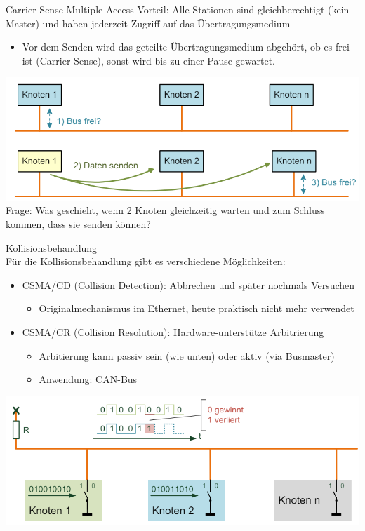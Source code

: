 \begin{definition}{Carrier Sense Multiple Access}
    Vorteil: Alle Stationen sind gleichberechtigt (kein Master) und haben jederzeit Zugriff auf das Übertragungsmedium
    \begin{itemize}
        \item Vor dem Senden wird das geteilte Übertragungsmedium abgehört, ob es frei ist (Carrier Sense), sonst wird bis zu einer Pause gewartet.
    \end{itemize}
        \includegraphics[width=0.75\linewidth]{images/random_access_thingy.png}\\
    Frage: Was geschieht, wenn 2 Knoten gleichzeitig warten und zum Schluss kommen, dass sie senden können?
\end{definition}

\begin{concept}{Kollisionsbehandlung}\\
    Für die Kollisionsbehandlung gibt es verschiedene Möglichkeiten:
    \begin{itemize}
        \item CSMA/CD (Collision Detection): Abbrechen und später nochmals Versuchen
        \begin{itemize}
            \item Originalmechanismus im Ethernet, heute praktisch nicht mehr verwendet
        \end{itemize}
        \item CSMA/CR (Collision Resolution): Hardware-unterstütze Arbitrierung
        \begin{itemize}
            \item Arbitierung kann passiv sein (wie unten) oder aktiv (via Busmaster)
            \item Anwendung: CAN-Bus
        \end{itemize}
    \end{itemize}
        \includegraphics[width=0.75\linewidth]{images/kollisionsbehandlung.png}
\end{concept}

